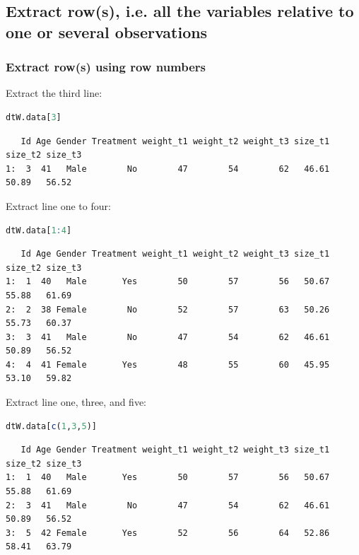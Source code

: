 \documentclass{article}
\begin{document}
\subsection{Extract row(s), i.e. all the variables relative to one or several observations}
\label{sec:org781b49a}

\subsubsection{Extract row(s) using row numbers}
\label{sec:orgb1fd34c}
Extract the third line:
\begin{lstlisting}[language=r,numbers=none]
dtW.data[3]
\end{lstlisting}

\label{}
\begin{verbatim}
   Id Age Gender Treatment weight_t1 weight_t2 weight_t3 size_t1 size_t2 size_t3
1:  3  41   Male        No        47        54        62   46.61   50.89   56.52
\end{verbatim}


Extract line one to four:
\begin{lstlisting}[language=r,numbers=none]
dtW.data[1:4]
\end{lstlisting}

\label{}
\begin{verbatim}
   Id Age Gender Treatment weight_t1 weight_t2 weight_t3 size_t1 size_t2 size_t3
1:  1  40   Male       Yes        50        57        56   50.67   55.88   61.69
2:  2  38 Female        No        52        57        63   50.26   55.73   60.37
3:  3  41   Male        No        47        54        62   46.61   50.89   56.52
4:  4  41 Female       Yes        48        55        60   45.95   53.10   59.82
\end{verbatim}


Extract line one, three, and five:
\begin{lstlisting}[language=r,numbers=none]
dtW.data[c(1,3,5)]
\end{lstlisting}

\label{}
\begin{verbatim}
   Id Age Gender Treatment weight_t1 weight_t2 weight_t3 size_t1 size_t2 size_t3
1:  1  40   Male       Yes        50        57        56   50.67   55.88   61.69
2:  3  41   Male        No        47        54        62   46.61   50.89   56.52
3:  5  42 Female       Yes        52        56        64   52.86   58.41   63.79
\end{verbatim}
\end{document}
